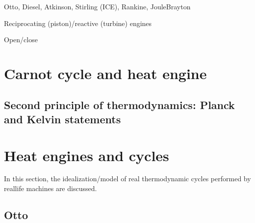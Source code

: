 \documentclass[letterpaper,10pt,english]{jupyterBook}
\begin{document}
\sphinxAtStartPar
{} Otto, Diesel, Atkinson, Stirling (ICE), Rankine, Joule\sphinxhyphen{}Brayton

\sphinxAtStartPar
{} Reciprocating (piston)/reactive (turbine) engines

\sphinxAtStartPar
{} Open/close


\section{Carnot cycle and heat engine}
\label{\detokenize{ch/heat-engines:carnot-cycle-and-heat-engine}}\label{\detokenize{ch/heat-engines:classical-thermodynamics-heat-engines-carnot}}

\subsection{Second principle of thermodynamics: Planck and Kelvin statements}
\label{\detokenize{ch/heat-engines:second-principle-of-thermodynamics-planck-and-kelvin-statements}}\label{\detokenize{ch/heat-engines:id1}}

\section{Heat engines and cycles}
\label{\detokenize{ch/heat-engines:heat-engines-and-cycles}}\label{\detokenize{ch/heat-engines:classical-thermodynamics-heat-engines-real}}
\sphinxAtStartPar
In this section, the idealization/model of real thermodynamic cycles performed by real\sphinxhyphen{}life machines are discussed.


\subsection{Otto}
\label{\detokenize{ch/heat-engines:otto}}\label{\detokenize{ch/heat-engines:classical-thermodynamics-heat-engines-real-otto}}
\sphinxAtStartPar
{}

\sphinxAtStartPar
{}
\end{document}

